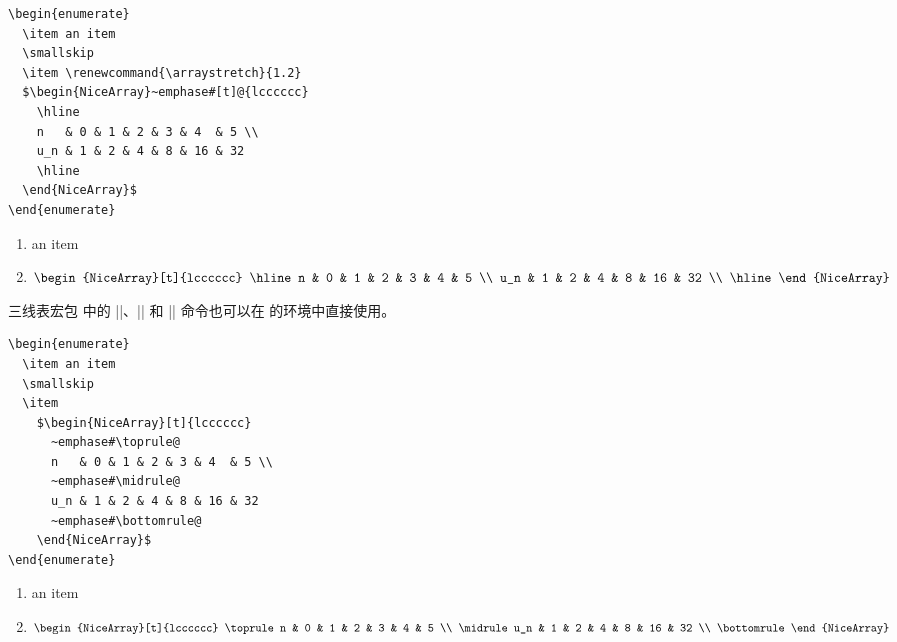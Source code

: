 \documentclass[dvipsnames]{article}%
\begin{document}
\bigskip
\begin{BVerbatim}[baseline=c,boxwidth=9cm]
\begin{enumerate}
  \item an item
  \smallskip
  \item \renewcommand{\arraystretch}{1.2}
  $\begin{NiceArray}~emphase#[t]@{lcccccc}
    \hline
    n   & 0 & 1 & 2 & 3 & 4  & 5 \\
    u_n & 1 & 2 & 4 & 8 & 16 & 32 
    \hline
  \end{NiceArray}$
\end{enumerate}
\end{BVerbatim}
%
\begin{minipage}{5cm}
\begin{enumerate}
\item an item
\smallskip
\item \renewcommand{\arraystretch}{1.2}
$\begin{NiceArray}[t]{lcccccc}
\hline
n   & 0 & 1 & 2 & 3 & 4  & 5  \\
u_n & 1 & 2 & 4 & 8 & 16 & 32 \\
\hline
\end{NiceArray}$
\end{enumerate}
\end{minipage}

\bigskip
三线表宏包  中的 |\toprule|、|\bottomrule| 和 |\midrule| 命令也可以在  的环境中直接使用。

\bigskip
\begin{BVerbatim}[baseline=c,boxwidth=9cm]
\begin{enumerate}
  \item an item
  \smallskip
  \item 
    $\begin{NiceArray}[t]{lcccccc}
      ~emphase#\toprule@
      n   & 0 & 1 & 2 & 3 & 4  & 5 \\
      ~emphase#\midrule@
      u_n & 1 & 2 & 4 & 8 & 16 & 32 
      ~emphase#\bottomrule@
    \end{NiceArray}$
\end{enumerate}
\end{BVerbatim}
\begin{minipage}{5cm}
  \begin{enumerate}
    \item an item
    \smallskip
    \item 
    $\begin{NiceArray}[t]{lcccccc}
      \toprule
      n   & 0 & 1 & 2 & 3 & 4  & 5  \\
      \midrule
      u_n & 1 & 2 & 4 & 8 & 16 & 32 \\
      \bottomrule
    \end{NiceArray}$
  \end{enumerate}
\end{minipage}
\end{document}
